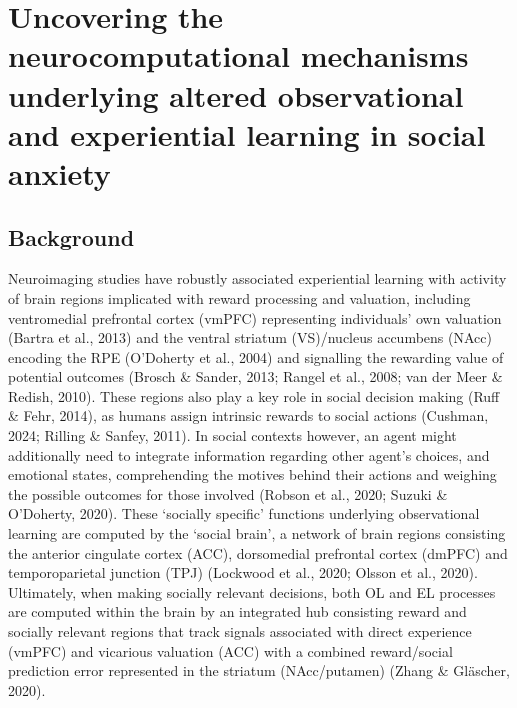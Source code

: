 \documentclass[12pt,a4paper,oneside,]{book} %
\begin{document}
\section{Uncovering the neurocomputational mechanisms underlying altered observational and experiential learning in social anxiety}\label{uncovering-the-neurocomputational-mechanisms-underlying-altered-observational-and-experiential-learning-in-social-anxiety}

\subsection{Background}\label{background}

Neuroimaging studies have robustly associated experiential learning with activity of brain regions implicated with reward processing and valuation, including ventromedial prefrontal cortex (vmPFC) representing individuals' own valuation (Bartra et al., 2013) and the ventral striatum (VS)/nucleus accumbens (NAcc) encoding the RPE (O'Doherty et al., 2004) and signalling the rewarding value of potential outcomes (Brosch \& Sander, 2013; Rangel et al., 2008; van der Meer \& Redish, 2010). These regions also play a key role in social decision making (Ruff \& Fehr, 2014), as humans assign intrinsic rewards to social actions (Cushman, 2024; Rilling \& Sanfey, 2011). In social contexts however, an agent might additionally need to integrate information regarding other agent's choices, and emotional states, comprehending the motives behind their actions and weighing the possible outcomes for those involved (Robson et al., 2020; Suzuki \& O'Doherty, 2020). These `socially specific' functions underlying observational learning are computed by the `social brain', a network of brain regions consisting the anterior cingulate cortex (ACC), dorsomedial prefrontal cortex (dmPFC) and temporoparietal junction (TPJ) (Lockwood et al., 2020; Olsson et al., 2020). Ultimately, when making socially relevant decisions, both OL and EL processes are computed within the brain by an integrated hub consisting reward and socially relevant regions that track signals associated with direct experience (vmPFC) and vicarious valuation (ACC) with a combined reward/social prediction error represented in the striatum (NAcc/putamen) (Zhang \& Gläscher, 2020).
\end{document}

